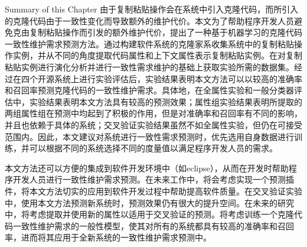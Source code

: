 
{Summary of this Chapter}
由于复制粘贴操作会在系统中引入克隆代码，而所引入的克隆代码由于一致性变化而导致额外的维护代价。本文为了帮助程序开发人员避免克由复制粘贴操作而引发的额外维护代价，提出了一种基于机器学习的克隆代码一致性维护需求预测方法。通过构建软件系统的克隆家系收集系统中的复制粘贴操作实例，并从不同的角度提取代码属性和上下文属性表示复制粘贴实例。在对复制粘贴实例进行演化分析并进行一致性需求维护的基础上获取实验所需的数据集。经过在四个开源系统上进行实验评估后，实验结果表明本文方法可以以较高的准确率和召回率预测克隆代码的一致性维护需求。具体地，在全属性实验和一般分类器评估中，实验结果表明本文方法具有较高的预测效果；属性组实验结果表明所提取的两组属性组在预测中均起到了积极的作用，但是对准确率和召回率有不同的影响，并且也依赖于具体的系统；交叉验证实验结果虽然不如全属性实验，但仍在可接受范围内。因此，本文建议对系统进行一致性需求预测时，优先选用自身数据进行训练，并可以根据不同的系统选择不同的度量值以满足程序开发人员的需求。

本文方法还可以方便的集成到软件开发环境中（如eclipse），从而在开发时帮助程序开发人员进行一致性维护需求预测。在未来工作中，将会考虑实现一个预测插件，将本文方法切实的应用到软件开发过程中帮助提高软件质量。在交叉验证实验中，使用本文方法预测新系统时，预测效果仍有很大的提升空间。在未来的研究中，将考虑提取并使用新的属性以适用于交叉验证的预测。将考虑训练一个克隆代码一致性维护需求的一般性模型，使其对所有的系统都具有较高的准确率和召回率，进而将其应用于全新系统的一致性维护需求预测中。
